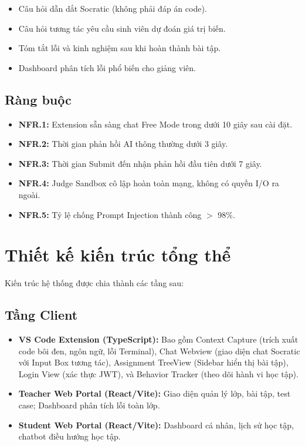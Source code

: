 \begin{itemize}
    \item Câu hỏi dẫn dắt Socratic (không phải đáp án code).
    \item Câu hỏi tương tác yêu cầu sinh viên dự đoán giá trị biến.
    \item Tóm tắt lỗi và kinh nghiệm sau khi hoàn thành bài tập.
    \item Dashboard phân tích lỗi phổ biến cho giảng viên.
\end{itemize}

\subsection{Ràng buộc}

\begin{itemize}
    \item \textbf{NFR.1:} Extension sẵn sàng chat Free Mode trong dưới 10 giây sau cài đặt.
    \item \textbf{NFR.2:} Thời gian phản hồi AI thông thường dưới 3 giây.
    \item \textbf{NFR.3:} Thời gian Submit đến nhận phản hồi đầu tiên dưới 7 giây.
    \item \textbf{NFR.4:} Judge Sandbox cô lập hoàn toàn mạng, không có quyền I/O ra ngoài.
    \item \textbf{NFR.5:} Tỷ lệ chống Prompt Injection thành công $>$ 98\%.
\end{itemize}

\section{Thiết kế kiến trúc tổng thể}


Kiến trúc hệ thống được chia thành các tầng sau:

\subsection{Tầng Client}

\begin{itemize}
    \item \textbf{VS Code Extension (TypeScript):} Bao gồm Context Capture (trích xuất code bôi đen, ngôn ngữ, lỗi Terminal), Chat Webview (giao diện chat Socratic với Input Box tương tác), Assignment TreeView (Sidebar hiển thị bài tập), Login View (xác thực JWT), và Behavior Tracker (theo dõi hành vi học tập).
    \item \textbf{Teacher Web Portal (React/Vite):} Giao diện quản lý lớp, bài tập, test case; Dashboard phân tích lỗi toàn lớp.
    \item \textbf{Student Web Portal (React/Vite):} Dashboard cá nhân, lịch sử học tập, chatbot điều hướng học tập.
\end{itemize}

